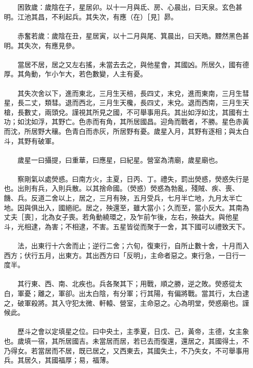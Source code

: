 \\\\
　　困敦歲：歲陰在子，星居卯。以十一月與氐、房、心晨出，曰天泉。玄色甚明。江池其昌，不利起兵。其失次，有應（在）［見］昴。
\\\\
　　赤奮若歲：歲陰在丑，星居寅，以十二月與尾、箕晨出，曰天皓。黫然黑色甚明。其失次，有應見參。
\\\\
　　當居不居，居之又左右搖，未當去去之，與他星會，其國凶。所居久，國有德厚。其角動，乍小乍大，若色數變，人主有憂。
\\\\
　　其失次舍以下，進而東北，三月生天棓，長四丈，末兌，進而東南，三月生彗星，長二丈，類彗。退而西北，三月生天欃，長四丈，末兌。退而西南，三月生天槍，長數丈，兩頭兌。謹視其所見之國，不可舉事用兵。其出如浮如沈，其國有土功；如沈如浮，其野亡。色赤而有角，其所居國昌。迎角而戰者，不勝。星色赤黃而沈，所居野大穰。色青白而赤灰，所居野有憂。歲星入月，其野有逐相；與太白斗，其野有破軍。
\\\\
　　歲星一曰攝提，曰重華，曰應星，曰紀星。營室為清廟，歲星廟也。
\\\\
　　察剛氣以處熒惑。曰南方火，主夏，日丙、丁。禮失，罰出熒惑，熒惑失行是也。出則有兵，入則兵散。以其捨命國。（熒惑）熒惑為勃亂，殘賊、疾、喪、饑、兵。反道二舍以上，居之，三月有殃，五月受兵，七月半亡地，九月太半亡地。因與俱出入，國絕祀。居之，殃還至，雖大當小；久而至，當小反大。其南為丈夫［喪］，北為女子喪。若角動繞環之，及乍前乍後，左右，殃益大。與他星斗，光相逮，為害；不相逮，不害。五星皆從而聚于一舍，其下國可以禮致天下。
\\\\
　　法，出東行十六舍而止；逆行二舍；六旬，復東行，自所止數十舍，十月而入西方；伏行五月，出東方。其出西方曰「反明」，主命者惡之。東行急，一日行一度半。
\\\\
　　其行東、西、南、北疾也。兵各聚其下；用戰，順之勝，逆之敗。熒惑從太白，軍憂；離之，軍卻。出太白陰，有分軍；行其陽，有偏將戰。當其行，太白逮之，破軍殺將。其入守犯太微、軒轅、營室，主命惡之。心為明堂，熒惑廟也。謹候此。
\\\\
　　歷斗之會以定填星之位。曰中央土，主季夏，日戊、己，黃帝，主德，女主象也。歲填一宿，其所居國吉。未當居而居，若已去而復還，還居之，其國得土，不乃得女。若當居而不居，既已居之，又西東去，其國失土，不乃失女，不可舉事用兵。其居久，其國福厚；易，福薄。
\\\\

